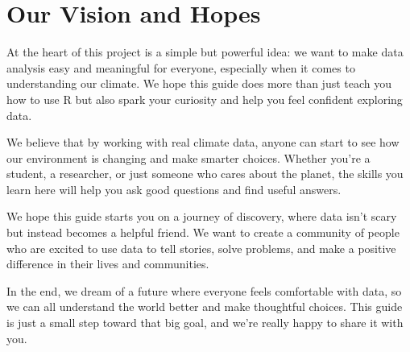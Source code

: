 \section*{Our Vision and Hopes}

At the heart of this project is a simple but powerful idea: we want to make data analysis easy and meaningful for everyone, especially when it comes to understanding our climate. We hope this guide does more than just teach you how to use R but also spark your curiosity and help you feel confident exploring data.

We believe that by working with real climate data, anyone can start to see how our environment is changing and make smarter choices. Whether you’re a student, a researcher, or just someone who cares about the planet, the skills you learn here will help you ask good questions and find useful answers.

We hope this guide starts you on a journey of discovery, where data isn’t scary but instead becomes a helpful friend. We want to create a community of people who are excited to use data to tell stories, solve problems, and make a positive difference in their lives and communities.

In the end, we dream of a future where everyone feels comfortable with data, so we can all understand the world better and make thoughtful choices. This guide is just a small step toward that big goal, and we’re really happy to share it with you.

\clearpage